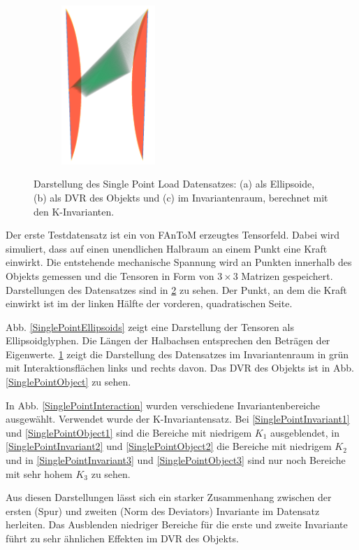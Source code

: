 \documentclass[a4paper,fontsize=12pt,toc=bib,halfparskip]{scrartcl}
\begin{document}
\begin{figure}
\begin{subfigure}{0.3\textwidth}
		\centering
		\includegraphics[height=6cm]{pictures/results/SinglePoint_InvariantSpace.png}
		\subcaption{}
		\label{SinglePointInvariantSpace}
	\end{subfigure}	
	\caption{Darstellung des Single Point Load Datensatzes: (a) als Ellipsoide, (b) als DVR des Objekts und (c) im Invariantenraum, berechnet mit den K-Invarianten.}
	\label{SinglePoint}
\end{figure}

Der erste Testdatensatz ist ein von FAnToM erzeugtes Tensorfeld. Dabei wird simuliert, dass auf einen unendlichen Halbraum an einem Punkt eine Kraft einwirkt. Die entstehende mechanische Spannung wird an Punkten innerhalb des Objekts gemessen und die Tensoren in Form von $3\times3$ Matrizen gespeichert. Darstellungen des Datensatzes sind in \ref{SinglePoint} zu sehen. Der Punkt, an dem die Kraft einwirkt ist im der linken H\"alfte der vorderen, quadratischen Seite. 

Abb. \ref{SinglePointEllipsoids} zeigt eine Darstellung der Tensoren als Ellipsoidglyphen. Die L\"angen der Halbachsen entsprechen den Betr\"agen der  Eigenwerte. \ref{SinglePointInvariantSpace} zeigt die Darstellung des Datensatzes im Invariantenraum in gr\"un mit Interaktionsfl\"achen links und rechts davon. Das DVR des Objekts ist in Abb. \ref{SinglePointObject} zu sehen.

In Abb. \ref{SinglePointInteraction} wurden verschiedene Invariantenbereiche ausgew\"ahlt. Verwendet wurde der K-Invariantensatz. Bei \ref{SinglePointInvariant1} und \ref{SinglePointObject1} sind die Bereiche mit niedrigem $K_1$ ausgeblendet, in \ref{SinglePointInvariant2} und \ref{SinglePointObject2} die Bereiche mit niedrigem $K_2$ und in \ref{SinglePointInvariant3} und \ref{SinglePointObject3} sind nur noch Bereiche mit sehr hohem $K_3$ zu sehen. 

Aus diesen Darstellungen l\"asst sich ein starker Zusammenhang zwischen der ersten (Spur) und zweiten (Norm des Deviators) Invariante im Datensatz herleiten. Das Ausblenden niedriger Bereiche f\"ur die erste und zweite Invariante f\"uhrt zu sehr \"ahnlichen Effekten im DVR des Objekts.  
\end{document}
